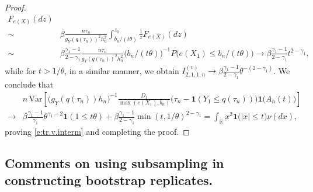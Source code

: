 \documentclass[12pt]{amsart}
\newcommand{\bbr}{\mathbb{R}}
\newcommand{\LFe}{F_{e(X)}}
\newcommand{\1}{\mathbbm{1}}
\newcommand{\0}{\mathbf{0}}
\newcommand{\one}{\mathbf{1}}
\newcommand{\var}{\mathrm{Var}}
\theoremstyle{plain}
\theoremstyle{definition}
\begin{document}
\begin{proof}
\begin{align*}
\LFe(dz) \\
\sim& \beta \frac{n\tau_n}{g_Y(q(\tau_n))^2h_n^2} 
\int_{b_n/(t\theta)}^{z_0} \frac1z \LFe(dz) \\
\sim& \beta\frac{\gamma_1-1}{2-\gamma_1}
      \frac{n\tau_n}{g_Y(q(\tau_n))^2h_n^2}
      \bigl(b_n/(t\theta)\bigr)^{-1}P\bigl(e(X_1)\leq
      b_n/(t\theta)\bigr)
      \to \beta\frac{\gamma_1-1}{2-\gamma_1}t^{2-\gamma_1}, 
\end{align*}
while for $t>1/\theta$, in a similar manner,
we obtain $
I_{2,1,1,n}^{(v)} \to
\beta\frac{\gamma_1-1}{2-\gamma_1}\theta^{-(2-\gamma_1)}$.
We conclude that 
\begin{align*}
&n\, \var\left[ \bigl(g_Y(q(\tau_n))h_n\bigr)^{-1}\frac{D_1}{\max(e(X_1),b_n)}
  \bigl( \tau_{n}-\one(Y_1\leq q(\tau_{n}))\bigr)  \one\bigl(
                               A_n(t)\bigr)\right] \\
\to& \beta\frac{\gamma_1-1}{\gamma_1} \theta^{\gamma_1-2} \one(1\leq
     t\theta)
+ \beta\frac{\gamma_1-1}{2-\gamma_1}\min(t,1/\theta)^{2-\gamma_1}
= \int_{\bbr} x^2\one\bigl( |x|\leq t\bigr)
\nu (dx),
\end{align*}
proving \eqref{e:tr.v.interm} and completing the proof. 
\end{proof}

\subsection{Comments on using subsampling in constructing bootstrap replicates.}  \label{subsample}
\end{document}
